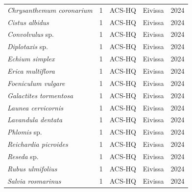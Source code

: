 \documentclass[]{article}
\renewcommand{\(}{\left(}
\renewcommand{\)}{\right)}
\renewcommand{\[}{\left[}
\renewcommand{\]}{\right]}
\begin{document}
\begin{longtable}{l r l l r}
    \textit{Chrysanthemum coronarium}      & 1 & ACS-HQ    & Eivissa    & 2024 \\
    \textit{Cistus albidus}                & 1 & ACS-HQ    & Eivissa    & 2024 \\
    \textit{Convolvulus} sp.               & 1 & ACS-HQ    & Eivissa    & 2024 \\
    \textit{Diplotaxis} sp.                & 1 & ACS-HQ    & Eivissa    & 2024 \\
    \textit{Echium simplex}                & 1 & ACS-HQ    & Eivissa    & 2024 \\
    \textit{Erica multiflora}              & 1 & ACS-HQ    & Eivissa    & 2024 \\
    \textit{Foeniculum vulgare}            & 1 & ACS-HQ    & Eivissa    & 2024 \\
    \textit{Galactites tormentosa}         & 1 & ACS-HQ    & Eivissa    & 2024 \\
    \textit{Launea cervicornis}            & 1 & ACS-HQ    & Eivissa    & 2024 \\
    \textit{Lavandula dentata}             & 1 & ACS-HQ    & Eivissa    & 2024 \\
    \textit{Phlomis} sp.                    & 1 & ACS-HQ    & Eivissa    & 2024 \\
    \textit{Reichardia picroides}          & 1 & ACS-HQ    & Eivissa    & 2024 \\
    \textit{Reseda} sp.                     & 1 & ACS-HQ    & Eivissa    & 2024 \\
    \textit{Rubus ulmifolius}              & 1 & ACS-HQ    & Eivissa    & 2024 \\
    \textit{Salvia rosmarinus}             & 1 & ACS-HQ    & Eivissa    & 2024 \\
\end{longtable}
\end{document}
